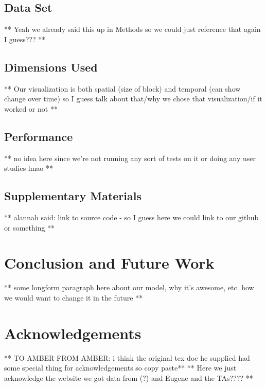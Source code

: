 \documentclass[journal]{vgtc}                %
\begin{document}
\subsection{Data Set}

** Yeah we already said this up in Methods so we could just reference that again I guess??? **

\subsection{Dimensions Used}

** Our visualization is both spatial (size of block) and temporal (can show change over time) so I guess talk about that/why we chose that visualization/if it worked or not **

\subsection{Performance}

** no idea here since we're not running any sort of tests on it or doing any user studies lmao **

\subsection{Supplementary Materials}
** alannah said: link to source code - so I guess here we could link to our github or something **

\section{Conclusion and Future Work}

** some longform paragraph here about our model, why it's awesome, etc. how we would want to change it in the future **

\section{Acknowledgements}

** TO AMBER FROM AMBER: i think the original tex doc he supplied had some special thing for acknowledgements so copy paste**
** Here we just acknowledge the website we got data from (?) and Eugene and the TAs???? **
\end{document}
